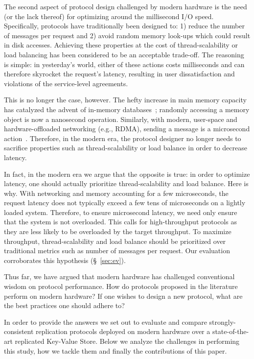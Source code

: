 \custvspace
The second aspect of protocol design challenged by modern hardware is the need (or the lack thereof) for optimizing around the millisecond I/O speed. 
Specifically, protocols have traditionally been designed to: 1) reduce the number of messages per request and 2) avoid random memory look-ups which could result in disk accesses. Achieving these properties at the cost of thread-scalability or load balancing has been considered to be an acceptable trade-off.
The reasoning is simple: in yesterday's world, either of these actions costs milliseconds and can therefore skyrocket the request's latency, resulting in user dissatisfaction and violations of the service-level agreements.


This is no longer the case, however. 
The hefty increase in main memory capacity has catalyzed the advent of in-memory databases~\cite{Lim:2014, Li:2016}; randomly accessing a memory object is now a nanosecond operation.
Similarly, with modern, user-space and hardware-offloaded networking (e.g., RDMA), sending a message is a microsecond action~\cite{Dragojevic:2014}.
Therefore, in the modern era, the protocol designer no longer needs to sacrifice properties such as thread-scalability or load balance in order to decrease latency. 

In fact, in the modern era we argue that the opposite is true: in order to optimize latency, one should actually prioritize thread-scalability and load balance.
Here is why. With networking and memory accounting for a few microseconds, the request latency does not typically exceed a few tens of microseconds on a lightly loaded system. 
Therefore, to ensure microsecond latency, we need only ensure that the system is not overloaded.
This calls for high-throughput protocols as they are less likely to be overloaded by the target throughput. 
To maximize throughput,  thread-scalability and load balance should be prioritized over traditional metrics such as number of messages per request.
Our evaluation corroborates this hypothesis (\S~\ref{sec:ev}).

Thus far, we have argued that modern hardware has challenged conventional wisdom on protocol performance. How do protocols proposed in the literature perform on modern hardware? If one wishes to design a new protocol, what are the best practices one should adhere to? 

In order to provide the answers we set out to evaluate and compare strongly-consistent replication protocols deployed on modern hardware 
over a state-of-the-art replicated Key-Value Store.
Below we analyze the challenges in performing this study, how we tackle them and finally the contributions of this paper.

